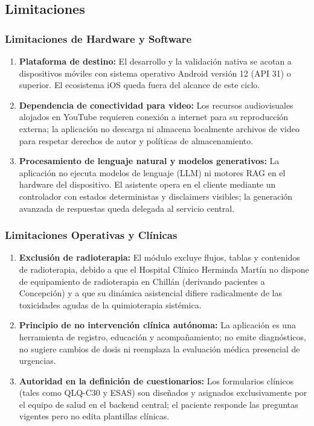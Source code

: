 \subsection{Limitaciones}

\subsubsection{Limitaciones de Hardware y Software}
\begin{enumerate}
    \item \textbf{Plataforma de destino:} El desarrollo y la validación nativa se acotan a dispositivos móviles con sistema operativo Android versión 12 (API 31) o superior. El ecosistema iOS queda fuera del alcance de este ciclo.
    \item \textbf{Dependencia de conectividad para video:} Los recursos audiovisuales alojados en YouTube requieren conexión a internet para su reproducción externa; la aplicación no descarga ni almacena localmente archivos de video para respetar derechos de autor y políticas de almacenamiento.
    \item \textbf{Procesamiento de lenguaje natural y modelos generativos:} La aplicación no ejecuta modelos de lenguaje (LLM) ni motores RAG en el hardware del dispositivo. El asistente opera en el cliente mediante un controlador con estados deterministas y disclaimers visibles; la generación avanzada de respuestas queda delegada al servicio central.
\end{enumerate}

\subsubsection{Limitaciones Operativas y Clínicas}
\begin{enumerate}
    \item \textbf{Exclusión de radioterapia:} El módulo excluye flujos, tablas y contenidos de radioterapia, debido a que el Hospital Clínico Herminda Martín no dispone de equipamiento de radioterapia en Chillán (derivando pacientes a Concepción) y a que su dinámica asistencial difiere radicalmente de las toxicidades agudas de la quimioterapia sistémica.
    \item \textbf{Principio de no intervención clínica autónoma:} La aplicación es una herramienta de registro, educación y acompañamiento; no emite diagnósticos, no sugiere cambios de dosis ni reemplaza la evaluación médica presencial de urgencias.
    \item \textbf{Autoridad en la definición de cuestionarios:} Los formularios clínicos (tales como QLQ-C30 y ESAS) son diseñados y asignados exclusivamente por el equipo de salud en el backend central; el paciente responde las preguntas vigentes pero no edita plantillas clínicas.
\end{enumerate}

